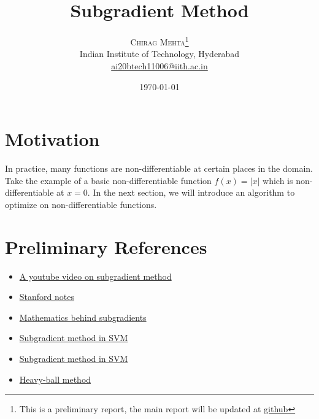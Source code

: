 \documentclass[twoside,twocolumn]{article}
\title{Subgradient Method} %
\author{%
\textsc{Chirag Mehta}\thanks{This is a preliminary report, the main report will be updated at \href{https://github.com/cmaspi/subgradient_method/blob/master/latex/main.pdf}{github}} \\[1ex] %
\normalsize Indian Institute of Technology, Hyderabad \\ %
\normalsize \href{mailto:ai20btech11006@iith.ac.in}{ai20btech11006@iith.ac.in} %
}
\date{\today} %
\begin{document}
\maketitle

\section{Motivation}
In practice, many functions are non-differentiable at certain places in the domain. Take the example of a basic non-differentiable function $f(x) = \left| x \right|$ which is non-differentiable at $x=0$. In the next section, we will introduce an algorithm to optimize on non-differentiable functions.












% 
% 

\section{Preliminary References}
\begin{itemize}
    \item \href{https://www.youtube.com/watch?v=jYtCiV1aP44}{A youtube video on subgradient method}
    \item \href{https://web.stanford.edu/class/ee392o/subgrad_method.pdf}{Stanford notes}
    \item \href{https://www.stat.cmu.edu/~ryantibs/convexopt-S15/scribes/06-subgradients-scribed.pdf}{Mathematics behind subgradients}
    \item \href{https://mcneela.github.io/machine_learning/2020/04/24/Subgradient-Descent.html}{Subgradient method in SVM}
    \item \href{https://davidrosenberg.github.io/mlcourse/Archive/2018/Lectures/03c.subgradient-descent.pdf}{Subgradient method in SVM}
    \item \href{https://web.stanford.edu/class/ee364b/lectures/subgrad_method_notes.pdf}{Heavy-ball method}
\end{itemize}
\end{document}
